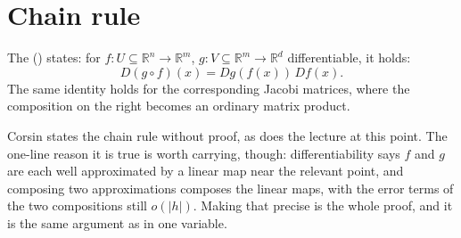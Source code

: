 \section{Chain rule}
\label{sec:chain_rule}

\begin{theorem}
\label{thm:chain_rule}
The  () states: for
$f : U \subseteq \mathbb{R}^n \to \mathbb{R}^m$, $g : V \subseteq \mathbb{R}^m \to \mathbb{R}^d$
differentiable, it holds:
\[D(g\circ f)(x) = Dg(f(x))\,Df(x).\]
The same identity holds for the corresponding Jacobi matrices, where the composition on the
right becomes an ordinary matrix product.
\end{theorem}

\begin{ainote}
Corsin states the chain rule without proof, as does the lecture at this point. The one-line
reason it is true is worth carrying, though: differentiability says $f$ and $g$ are each well
approximated by a linear map near the relevant point, and composing two approximations composes
the linear maps, with the error terms of the two compositions still $o(|h|)$. Making that
precise is the whole proof, and it is the same argument as in one variable.
\end{ainote}

